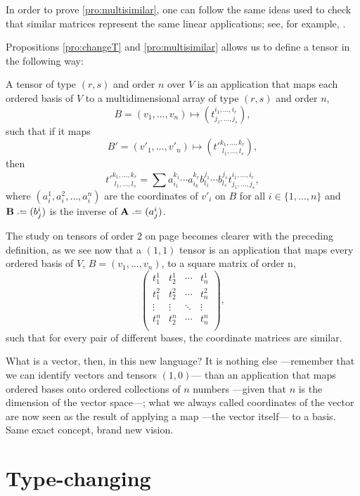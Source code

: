 In order to prove \autoref{pro:multisimilar}, one can follow the same ideas used to check that similar matrices represent the same linear applications; see, for example, \cite[p. 145]{romero86}.

Propositions \ref{pro:changeT} and \ref{pro:multisimilar} allows us to define a tensor in the following way:

\begin{definition}
	A tensor of type $(r,s)$ and order $n$ over $V$ is an application that maps each ordered basis of $V$ to a multidimensional array of type $(r,s)$ and order $n$,
	\[
		B = (v_1, \dots, v_n) \mapsto \left( t_{j_1,\dots,j_s}^{i_1,\dots,i_r} \right),
	\]
	such that if it maps 
	\[
		B' = (v'_1, \dots, v'_n) \mapsto \left( t'^{k_1,\dots,k_r}_{\phantom{'}l_1,\dots,l_s} \right),
	\]
	then
	\[
	t'^{k_1,\dots,k_r}_{\phantom{'}l_1,\dots,l_s} = \sum a_{i_1}^{k_1} \cdots a_{i_k}^{k_r} b_{l_1}^{j_1} \cdots b_{l_s}^{j_s} t_{j_1,\dots,j_s}^{i_1,\dots,i_r},
	\]
	where $(a_i^1, a_i^2, \dots, a_i^n)$ are the coordinates of $v'_i$ on $B$ for all $i \in \{1, \dots, n\}$ and $\mathbf{B} \defeq (b^i_j)$ is the inverse of $\mathbf{A} \defeq (a^i_j)$.
\end{definition}

The study on tensors of order 2 on page \pageref{sub:order2} becomes clearer with the preceding definition, as we see now that a $(1,1)$ tensor is an application that maps every ordered basis of $V$, $B=(v_1, \dots, v_n)$, to a square matrix of order n,
\[
	\begin{pmatrix}
	t^1_1 & t^1_2 & \cdots & t^1_n \\
	t^2_1 & t^2_2 & \cdots & t^2_n \\
	\vdots & \vdots & \ddots & \vdots \\
	t^n_1 & t^n_2 & \cdots & t^n_n \\
	\end{pmatrix},
\]
such that for every pair of different bases, the coordinate matrices are similar.

What is a vector, then, in this new language? It is nothing else ---remember that we can identify vectors and tensors $(1,0)$--- than an application that maps ordered bases onto ordered collections of $n$ numbers ---given that $n$ is the dimension of the vector space---; what we always called coordinates of the vector are now seen as the result of applying a map ---the vector itself--- to a basis. Same exact concept, brand new vision.
	
\section{Type-changing}

